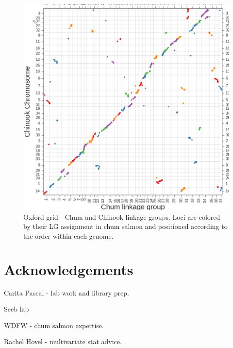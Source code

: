 \documentclass[12pt, one column]{article}
\begin{document}
\begin{figure}[H]
\includegraphics[scale=.25]{figures/supplemental/synteny_chinook.png}
\caption{Oxford grid - Chum and Chinook linkage groups. Loci are colored by their LG assignment in chum salmon and positioned according to the order within each genome.}
\end{figure}





\section*{Acknowledgements}
Carita Pascal - lab work and library prep.

Seeb lab

WDFW - chum salmon expertise.

Rachel Hovel - multivariate stat advice.
\end{document}
